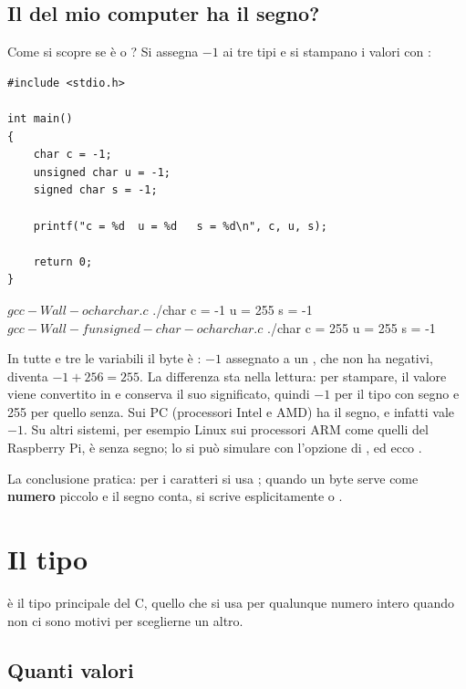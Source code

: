 \subsection{Il  del mio computer ha il segno?}

Come si scopre se  è  o ? Si assegna
$-1$ ai tre tipi e si stampano i valori con :

\begin{affianco}[0.5][c]
\begin{lstlisting}[style=c, name=char.c]
#include <stdio.h>

int main()
{
    char c = -1;
    unsigned char u = -1;
    signed char s = -1;

    printf("c = %d  u = %d   s = %d\n", c, u, s);

    return 0;
}
\end{lstlisting}
\risultato
\begin{console}
$ gcc -Wall -o char char.c
$ ./char
c = -1  u = 255   s = -1
$ gcc -Wall -funsigned-char -o char char.c
$ ./char
c = 255  u = 255   s = -1
\end{console}
\end{affianco}

In tutte e tre le variabili il byte è : $-1$ assegnato a un
, che non ha negativi, diventa $-1 + 256 = 255$. La
differenza sta nella lettura: per stampare, il valore viene convertito in
 e conserva il suo significato, quindi $-1$ per il tipo con segno e
255 per quello senza. Sui PC (processori Intel e AMD)  ha il
segno, e infatti  vale $-1$. Su altri sistemi, per esempio Linux sui
processori ARM come quelli del Raspberry Pi,  è senza segno; lo si
può simulare con l'opzione  di , ed ecco
.

La conclusione pratica: per i caratteri si usa ; quando un byte
serve come \textbf{numero} piccolo e il segno conta, si scrive esplicitamente
 o .

\section{Il tipo }

 è il tipo principale del C, quello che si usa per qualunque
numero intero quando non ci sono motivi per sceglierne un altro.

\subsection{Quanti valori}

